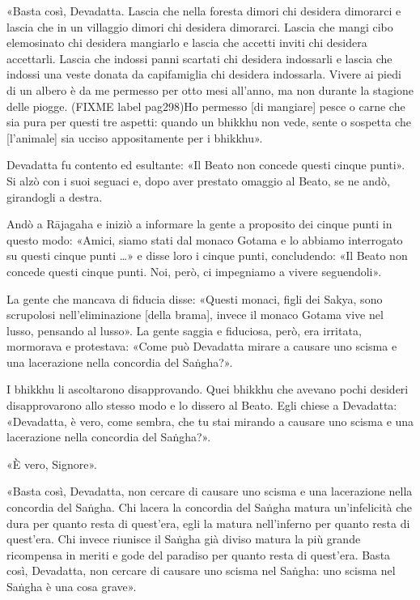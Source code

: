 «Basta così, Devadatta. Lascia che nella foresta dimori chi desidera
dimorarci e lascia che in un villaggio dimori chi desidera dimorarci.
Lascia che mangi cibo elemosinato chi desidera mangiarlo e lascia che
accetti inviti chi desidera accettarli. Lascia che indossi panni
scartati chi desidera indossarli e lascia che indossi una veste donata
da capifamiglia chi desidera indossarla. Vivere ai piedi di un albero è
da me permesso per otto mesi all’anno, ma non durante la stagione delle
piogge. (FIXME label pag298)Ho permesso [di mangiare] pesce o carne che sia pura per questi
tre aspetti: quando un bhikkhu non vede, sente o sospetta che
[l’animale] sia ucciso appositamente per i bhikkhu».


Devadatta fu contento ed esultante: «Il Beato non concede questi cinque
punti». Si alzò con i suoi seguaci e, dopo aver prestato omaggio al
Beato, se ne andò, girandogli a destra.


Andò a Rājagaha e iniziò a informare la gente a proposito dei cinque
punti in questo modo: «Amici, siamo stati dal monaco Gotama e lo abbiamo
interrogato su questi cinque punti …» e disse loro i cinque punti,
concludendo: «Il Beato non concede questi cinque punti. Noi, però, ci
impegniamo a vivere seguendoli».


La gente che mancava di fiducia disse: «Questi monaci, figli dei Sakya,
sono scrupolosi nell’eliminazione [della brama], invece il monaco Gotama
vive nel lusso, pensando al lusso». La gente saggia e fiduciosa, però,
era irritata, mormorava e protestava: «Come può Devadatta mirare a
causare uno scisma e una lacerazione nella concordia del Saṅgha?».


I bhikkhu li ascoltarono disapprovando. Quei bhikkhu che avevano pochi
desideri disapprovarono allo stesso modo e lo dissero al Beato. Egli
chiese a Devadatta: «Devadatta, è vero, come sembra, che tu stai mirando
a causare uno scisma e una lacerazione nella concordia del Saṅgha?».


«È vero, Signore».


«Basta così, Devadatta, non cercare di causare uno scisma e una
lacerazione nella concordia del Saṅgha. Chi lacera la concordia del
Saṅgha matura un’infelicità che dura per quanto resta di quest’era, egli
la matura nell’inferno per quanto resta di quest’era. Chi invece
riunisce il Saṅgha già diviso matura la più grande ricompensa in meriti
e gode del paradiso per quanto resta di quest’era. Basta così,
Devadatta, non cercare di causare uno scisma nel Saṅgha: uno scisma nel
Saṅgha è una cosa grave».


